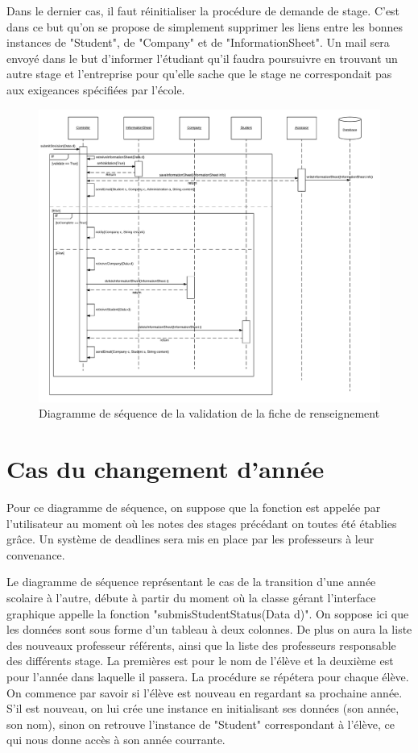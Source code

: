 \documentclass{scrreprt}
\begin{document}
	Dans le dernier cas, il faut réinitialiser la procédure de demande de stage. C'est dans ce but qu'on se propose de simplement supprimer 
les liens entre les bonnes instances de "Student", de "Company" et de "InformationSheet". Un mail sera envoyé dans le but d'informer l'étudiant
qu'il faudra poursuivre en trouvant un autre stage et l'entreprise pour qu'elle sache que le stage ne correspondait pas aux exigeances spécifiées
par l'école. 

\newpage
\begin{figure}[h]
\centering
\includegraphics[width=15cm]{images/validationSeqDiagram.png}
\caption{Diagramme de séquence de la validation de la fiche de renseignement}
\end{figure}

\newpage
\section{Cas du changement d'année}

	Pour ce diagramme de séquence, on suppose que la fonction est appelée par l'utilisateur au moment où les notes des stages
précédant on toutes été établies grâce. Un système de deadlines sera mis en place par les professeurs à leur convenance. 

	Le diagramme de séquence représentant le cas de la transition d'une année scolaire à l'autre, débute à partir du moment
où la classe gérant l'interface graphique appelle la fonction "submisStudentStatus(Data d)". On soppose ici que les données
sont sous forme d'un tableau à deux colonnes. De plus on aura la liste des nouveaux professeur référents, ainsi que la liste des professeurs
responsable des différents stage. La premières est pour le nom de l'élève et la deuxième est pour l'année dans laquelle
il passera. La procédure se répétera pour chaque élève. On commence par savoir si l'élève est nouveau en regardant sa prochaine année.
S'il est nouveau, on lui crée une instance en initialisant ses données (son année, son nom), sinon on retrouve l'instance de "Student" 
correspondant à l'élève, ce qui nous donne accès à son année courrante. 
\end{document}

